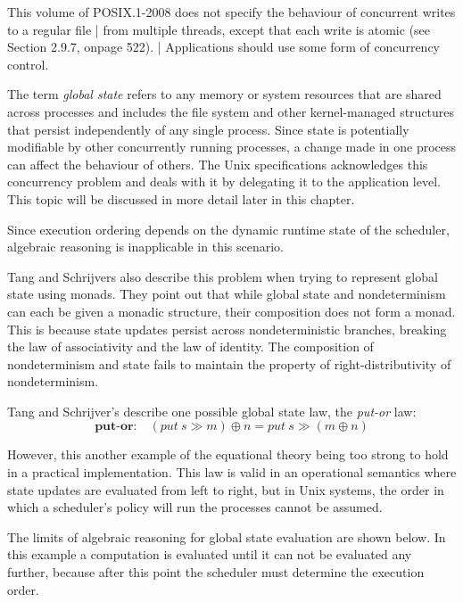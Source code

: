 \documentclass[logo,bsc,singlespacing,parskip]{infthesis}
\begin{document}
\begin{tcolorbox}[colback=gray!10, colframe=gray!60, sharp corners, boxrule=0.5pt, title={POSIX Base Specifications, Issue 7, p.2316}]
 This volume of POSIX.1-2008 does not specify the behaviour of concurrent writes to a regular file |
 from multiple threads, except that each write is atomic (see Section 2.9.7, onpage 522). |
 Applications should use some form of concurrency control.
\end{tcolorbox}

The term \textit{global state} refers to any memory or system resources that are shared across processes and includes the file system and other kernel-managed structures that persist independently of any single process. Since {state} is potentially modifiable by other concurrently running processes, a change made in one process can affect the behaviour of others. The Unix specifications acknowledges this concurrency problem and deals with it by delegating it to the application level. This topic will be discussed in more detail later in this chapter. 

Since execution ordering depends on the dynamic runtime state of the scheduler, algebraic reasoning is inapplicable in this scenario. 

Tang and Schrijvers also describe this problem when trying to represent global state using monads. They point out that while global state and nondeterminism can each be given a monadic structure, their composition does not form a monad. This is because state updates persist across nondeterministic branches, breaking the law of associativity and the law of identity. The composition of {nondeterminism} and {state} fails to maintain the property of right-distributivity of {nondeterminism}.


Tang and Schrijver's describe one possible global state law, the \textit{put-or} law: 
\[
\textbf{put-or:} \quad (put\ s \gg m) \oplus n = put\ s \gg (m \oplus n) 
\]

However, this another example of the equational theory being too strong to hold in a practical implementation. This law is valid in an {operational semantics} where state updates are evaluated from left to right, but in Unix systems, the order in which a scheduler's policy will run the processes cannot be assumed.


The limits of algebraic reasoning for global state evaluation are shown below. In this example a computation is evaluated until it can not be evaluated any further, because after this point the scheduler must determine the execution order.
\end{document}
